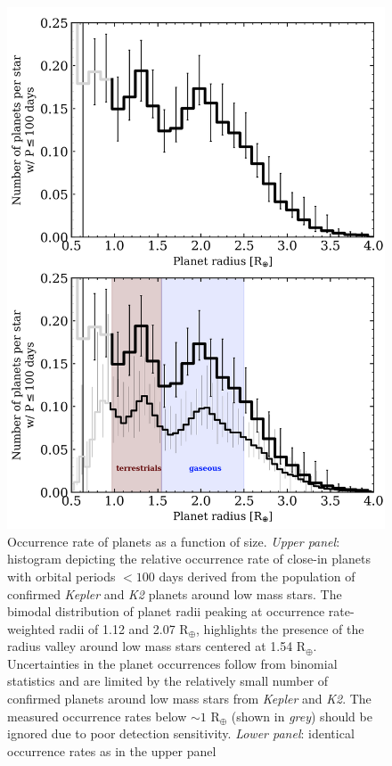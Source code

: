 \documentclass[twocolumn]{emulateapj}
\newcommand{\kepler}[1]{\emph{Kepler}#1}
\newcommand{\ktwo}[1]{\emph{K2}#1}
\begin{document}
  
\begin{figure}
  \centering
  \includegraphics[scale=.8]{figures/rphist_double.png}
  \caption{Occurrence rate of planets as a function of size. \emph{Upper panel}:
    histogram depicting the relative occurrence
    rate of close-in planets with orbital periods $<100$ days derived from the population of confirmed
    \kepler{} and \ktwo{} planets around low mass stars. The bimodal distribution of planet radii peaking
    at occurrence rate-weighted radii of 1.12 and 2.07 R$_{\oplus}$, highlights the presence of the radius valley
    around low mass stars centered at 1.54 R$_{\oplus}$. Uncertainties in the planet occurrences follow from binomial
    statistics and are limited by
    the relatively small number of confirmed planets around low mass stars from \kepler{} and \ktwo{.} 
    The measured occurrence rates below $\sim 1$ R$_{\oplus}$ (shown in \emph{grey}) should be ignored due to
    poor detection sensitivity. \emph{Lower panel}: identical occurrence rates as in the upper panel 
}
\end{figure}
\end{document}
